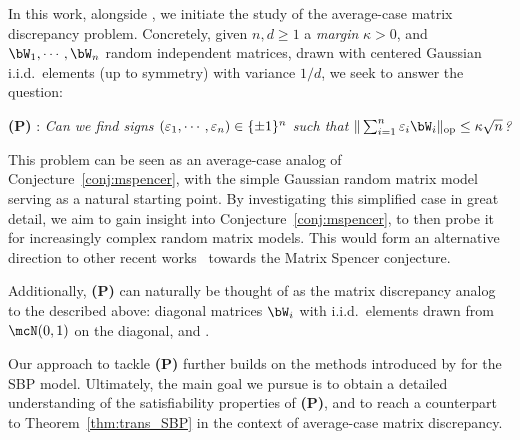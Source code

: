 In this work, 
alongside \cite{kunisky2023online},
we initiate the study of the average-case matrix discrepancy problem.
Concretely, given $n, d \geq 1$ a \emph{margin} $\kappa > 0$, and $\bW_1, \cdots, \bW_n$ random independent matrices, drawn with centered Gaussian i.i.d.\ elements (up to symmetry) with variance $1/d$, we seek to answer the question: 
\begin{center}
   \textrm{\textbf{(P)}} : \textit{Can we find signs $(\varepsilon_1, \cdots, \varepsilon_n) \in \{\pm 1\}^n$ such that $\|\sum_{i=1}^n \eps_i \bW_i\|_\op \leq \kappa \sqrt{n}$?}
\end{center}
\noindent 
This problem can be seen as an average-case analog of Conjecture~\ref{conj:mspencer}, with the simple Gaussian random matrix model serving as a natural starting point.
By investigating this simplified case in great detail, we aim to gain insight into Conjecture~\ref{conj:mspencer},
to then probe it for increasingly complex random matrix models. This would form an alternative direction to other recent works~\citep{hopkins2022matrix,dadush2022new,bansal2023resolving} towards the Matrix Spencer conjecture.

\myskip 
Additionally, \textbf{(P)} can naturally be thought of as the matrix discrepancy analog to the 
described above:
diagonal matrices $\bW_i$ with i.i.d.\ elements drawn from $\mcN(0,1)$ on the diagonal, 
and .

\myskip
{}
Our approach to tackle \textbf{(P)} further builds on the methods introduced by \cite{aubin2019storage} for the SBP model.
Ultimately, the main goal we pursue is to obtain a detailed understanding of the satisfiability properties of \textbf{(P)}, 
and to reach a counterpart to Theorem~\ref{thm:trans_SBP} in the context of average-case matrix discrepancy.

